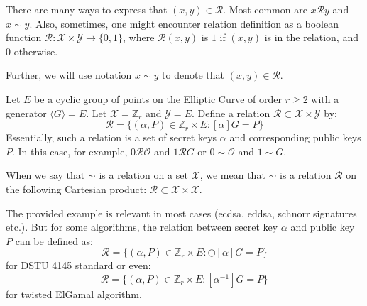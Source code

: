 \documentclass[../lecture-notes-148x210.tex]{subfiles}
\begin{document}
\begin{remark}
    There are many ways to express that $(x,y) \in \mathcal{R}$. Most common are $x \mathcal{R} y$ and $x \sim y$. Also, sometimes, one might encounter relation definition as a boolean function $\mathcal{R}: \mathcal{X} \times \mathcal{Y} \to \{0,1\}$, where $\mathcal{R}(x,y)$ is $1$ if $(x,y)$ is in the relation, and $0$ otherwise.

    Further, we will use notation $x \sim y$ to denote that $(x,y) \in \mathcal{R}$.
\end{remark}

\begin{example}
    Let $E$ be a cyclic group of points on the Elliptic Curve of order $r \geq 2$ with a generator $\langle G \rangle = E$. Let $\mathcal{X} = \mathbb{Z}_r$ and $\mathcal{Y} = E$. Define a relation $\mathcal{R} \subset \mathcal{X} \times \mathcal{Y}$ by:
    \begin{equation*}
        \mathcal{R} = \{(\alpha, P) \in \mathbb{Z}_r \times E: [\alpha]G = P\}
    \end{equation*}
    Essentially, such a relation is a set of secret keys $\alpha$ and corresponding public keys $P$. In this case, for example, $0\mathcal{R}\mathcal{O}$ and $1\mathcal{R}G$ or $0 \sim \mathcal{O}$ and $1 \sim G$.
\end{example}

\begin{remark}
    When we say that $\sim$ is a relation on a set $\mathcal{X}$, we mean that $\sim$ is a relation $\mathcal{R}$ on the following Cartesian product: $\mathcal{R} \subset \mathcal{X} \times \mathcal{X}$.
\end{remark}

\begin{remark}
    The provided example is relevant in most cases (ecdsa, eddsa, schnorr signatures etc.). But for some algorithms, the relation between secret key $\alpha$ and public key $P$ can be defined as:
    \begin{equation*}
        \mathcal{R} = \{(\alpha, P) \in \mathbb{Z}_r \times E: \ominus[\alpha]G = P\}
    \end{equation*} 
    for DSTU 4145 standard or even:
    \begin{equation*}
        \mathcal{R} = \{(\alpha, P) \in \mathbb{Z}_r \times E: [\alpha^{-1}]G = P\}
    \end{equation*}
    for twisted ElGamal algorithm.
\end{remark}
\end{document}
